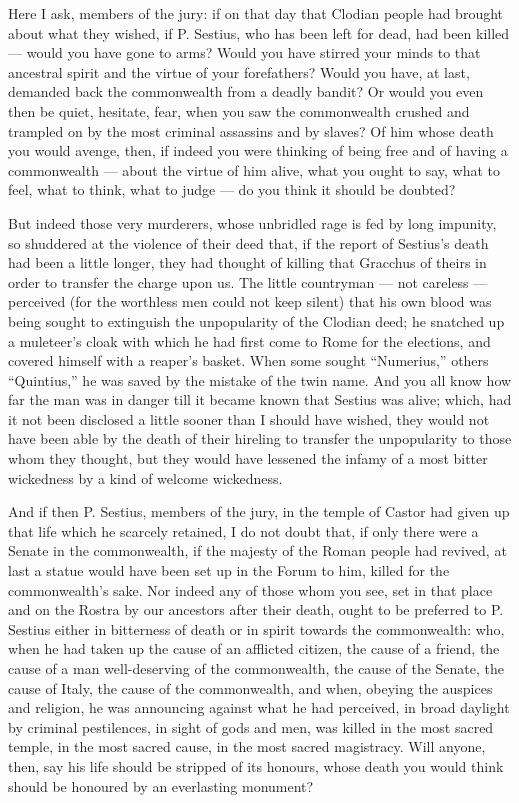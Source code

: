  Here I ask, members of the jury: if on that day that Clodian people had brought about what they wished, if P. Sestius, who has been left for dead, had been killed --- would you have gone to arms? Would you have stirred your minds to that ancestral spirit and the virtue of your forefathers? Would you have, at last, demanded back the commonwealth from a deadly bandit? Or would you even then be quiet, hesitate, fear, when you saw the commonwealth crushed and trampled on by the most criminal assassins and by slaves? Of him whose death you would avenge, then, if indeed you were thinking of being free and of having a commonwealth --- about the virtue of him alive, what you ought to say, what to feel, what to think, what to judge --- do you think it should be doubted?

 But indeed those very murderers, whose unbridled rage is fed by long impunity, so shuddered at the violence of their deed that, if the report of Sestius's death had been a little longer, they had thought of killing that Gracchus of theirs in order to transfer the charge upon us. The little countryman --- not careless --- perceived (for the worthless men could not keep silent) that his own blood was being sought to extinguish the unpopularity of the Clodian deed; he snatched up a muleteer's cloak with which he had first come to Rome for the elections, and covered himself with a reaper's basket. When some sought ``Numerius,'' others ``Quintius,'' he was saved by the mistake of the twin name. And you all know how far the man was in danger till it became known that Sestius was alive; which, had it not been disclosed a little sooner than I should have wished, they would not have been able by the death of their hireling to transfer the unpopularity to those whom they thought, but they would have lessened the infamy of a most bitter wickedness by a kind of welcome wickedness.

 And if then P. Sestius, members of the jury, in the temple of Castor had given up that life which he scarcely retained, I do not doubt that, if only there were a Senate in the commonwealth, if the majesty of the Roman people had revived, at last a statue would have been set up in the Forum to him, killed for the commonwealth's sake. Nor indeed any of those whom you see, set in that place and on the Rostra by our ancestors after their death, ought to be preferred to P. Sestius either in bitterness of death or in spirit towards the commonwealth: who, when he had taken up the cause of an afflicted citizen, the cause of a friend, the cause of a man well-deserving of the commonwealth, the cause of the Senate, the cause of Italy, the cause of the commonwealth, and when, obeying the auspices and religion, he was announcing against what he had perceived, in broad daylight by criminal pestilences, in sight of gods and men, was killed in the most sacred temple, in the most sacred cause, in the most sacred magistracy. Will anyone, then, say his life should be stripped of its honours, whose death you would think should be honoured by an everlasting monument?

